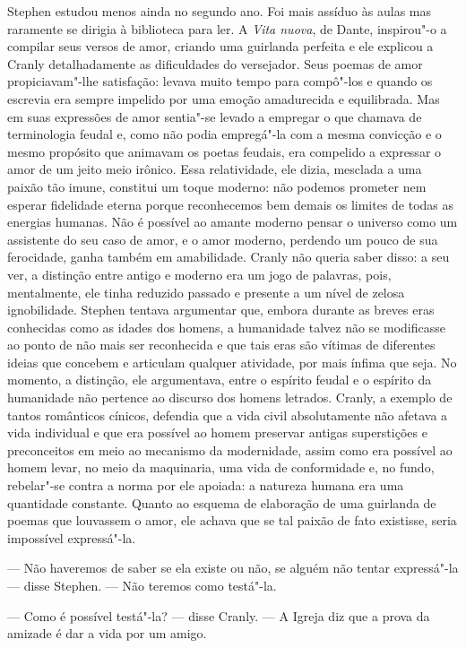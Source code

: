 Stephen estudou menos ainda no segundo ano.  Foi mais assíduo às aulas mas
raramente se dirigia à biblioteca para ler.  A \textit{Vita nuova}, de Dante,
inspirou"-o a compilar seus versos de amor, criando uma guirlanda perfeita e ele
explicou a Cranly detalhadamente as dificuldades do versejador.  Seus poemas de
amor propiciavam"-lhe satisfação: levava muito tempo para compô"-los e quando os
escrevia era sempre impelido por uma emoção amadurecida e equilibrada.  Mas em
suas expressões de amor sentia"-se levado a empregar o que chamava de
terminologia feudal e, como não podia empregá"-la com a mesma convicção e o
mesmo propósito que animavam os poetas feudais, era compelido a expressar o
amor de um jeito meio irônico.  Essa relatividade, ele dizia, mesclada a uma
paixão tão imune, constitui um toque moderno: não podemos prometer nem esperar
fidelidade eterna porque reconhecemos bem demais os limites de todas as
energias humanas.  Não é possível ao amante moderno pensar o universo como um
assistente do seu caso de amor, e o amor moderno, perdendo um pouco de sua
ferocidade, ganha também em amabilidade.  Cranly não queria saber disso: a seu
ver, a distinção entre antigo e moderno era um jogo de palavras, pois,
mentalmente, ele tinha reduzido passado e presente a um nível de zelosa
ignobilidade.  Stephen tentava argumentar que, embora durante as breves eras		
conhecidas como as idades dos homens, a humanidade talvez não se modificasse ao
ponto de não mais ser reconhecida e que tais eras são vítimas de diferentes
ideias que concebem e articulam qualquer atividade, por mais ínfima que seja.
No momento, a distinção, ele argumentava, entre o espírito feudal e o espírito
da humanidade não pertence ao discurso dos homens letrados.  Cranly, a exemplo
de tantos românticos cínicos, defendia que a vida civil absolutamente não
afetava a vida individual e que era possível ao homem preservar antigas
superstições e preconceitos em meio ao mecanismo da modernidade, assim como era
possível ao homem levar, no meio da maquinaria, uma vida de conformidade e, no
fundo, rebelar"-se contra a norma por ele apoiada: a natureza humana era uma
quantidade constante.  Quanto ao esquema de elaboração de uma guirlanda de
poemas que louvassem o amor, ele achava que se tal paixão de fato existisse,
seria impossível expressá"-la.

--- Não haveremos de saber se ela existe ou não, se alguém não tentar
expressá"-la --- disse Stephen.  --- Não teremos como testá"-la.

--- Como é possível testá"-la? --- disse Cranly.  --- A Igreja diz que a
prova da amizade é dar a vida por um amigo.


